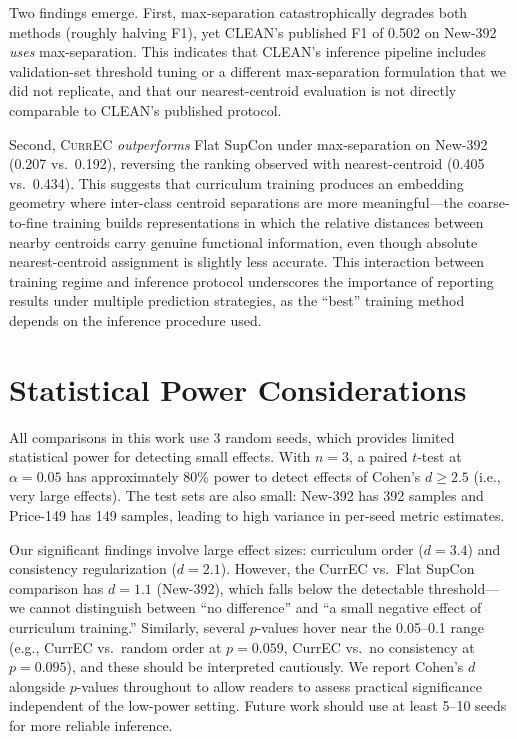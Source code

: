 \documentclass{article}
\newcommand{\currec}{\textsc{CurrEC}}
\begin{document}
Two findings emerge. First, max-separation catastrophically degrades both methods (roughly halving F1), yet CLEAN's published F1 of 0.502 on New-392 \emph{uses} max-separation. This indicates that CLEAN's inference pipeline includes validation-set threshold tuning or a different max-separation formulation that we did not replicate, and that our nearest-centroid evaluation is not directly comparable to CLEAN's published protocol.

Second, \currec{} \emph{outperforms} Flat SupCon under max-separation on New-392 (0.207 vs.\ 0.192), reversing the ranking observed with nearest-centroid (0.405 vs.\ 0.434). This suggests that curriculum training produces an embedding geometry where inter-class centroid separations are more meaningful---the coarse-to-fine training builds representations in which the relative distances between nearby centroids carry genuine functional information, even though absolute nearest-centroid assignment is slightly less accurate. This interaction between training regime and inference protocol underscores the importance of reporting results under multiple prediction strategies, as the ``best'' training method depends on the inference procedure used.

\section{Statistical Power Considerations}\label{app:statistical}

All comparisons in this work use 3 random seeds, which provides limited statistical power for detecting small effects. With $n=3$, a paired $t$-test at $\alpha = 0.05$ has approximately 80\% power to detect effects of Cohen's $d \geq 2.5$ (i.e., very large effects). The test sets are also small: New-392 has 392 samples and Price-149 has 149 samples, leading to high variance in per-seed metric estimates.

Our significant findings involve large effect sizes: curriculum order ($d = 3.4$) and consistency regularization ($d = 2.1$). However, the CurrEC vs.\ Flat SupCon comparison has $d = 1.1$ (New-392), which falls below the detectable threshold---we cannot distinguish between ``no difference'' and ``a small negative effect of curriculum training.'' Similarly, several $p$-values hover near the 0.05--0.1 range (e.g., CurrEC vs.\ random order at $p = 0.059$, CurrEC vs.\ no consistency at $p = 0.095$), and these should be interpreted cautiously. We report Cohen's $d$ alongside $p$-values throughout to allow readers to assess practical significance independent of the low-power setting. Future work should use at least 5--10 seeds for more reliable inference.
\end{document}

